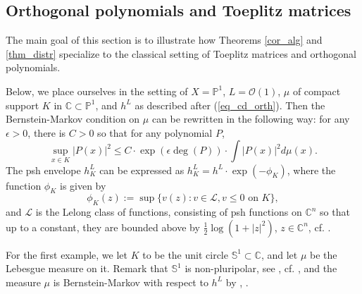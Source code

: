 \documentclass[12pt]{article}
\numberwithin{equation}{section}
\theoremstyle{theorem}
\theoremstyle{definition}
\theoremstyle{remark}
\newcommand{\comp}{\mathbb{C}}
\begin{document}
	\subsection{Orthogonal polynomials and Toeplitz matrices}\label{sect_mat}
	The main goal of this section is to illustrate how Theorems \ref{cor_alg} and \ref{thm_distr} specialize to the classical setting of Toeplitz matrices and orthogonal polynomials.
	\par 
	Below, we place ourselves in the setting of $X = \mathbb{P}^1$, $L = \mathscr{O}(1)$, $\mu$ of compact support $K$ in $\comp \subset \mathbb{P}^1$, and $h^L$ as described after (\ref{eq_cd_orth}).
	Then the Bernstein-Markov condition on $\mu$  can be rewritten in the following way: for any $\epsilon > 0$, there is $C > 0$ so that for any polynomial $P$, 
	\begin{equation}\label{eq_bm_clas0}
		\sup_{x \in K} |P(x)|^2
		\leq
		C
		\cdot
		\exp(\epsilon \deg(P))
		\cdot
		\int |P(x)|^2 d \mu(x).
	\end{equation}
	The psh envelope $h^L_K$ can be expressed as $h^L_K = h^L \cdot \exp(-\phi_K)$, where the function $\phi_K$ is given by
	\begin{equation}
		\phi_K(z) := \sup \{ v(z) : v \in \mathcal{L}, v \leq 0 \text{ on } K \},
	\end{equation}
	and $\mathcal{L}$ is the Lelong class of functions, consisting of psh functions on $\comp^n$ so that up to a constant, they are bounded above by $\frac{1}{2} \log (1 + |z|^2)$, $z \in \comp^n$, cf. \cite[Example 1.2]{GuedZeriGeomAnal}.
	\par 
	For the first example, we let $K$ to be the unit circle $\mathbb{S}^1 \subset \comp$, and let $\mu$ be the Lebesgue measure on it.
	Remark that $\mathbb{S}^1$ is non-pluripolar, see \cite{SadullaevReal}, cf. \cite[Exercise 4.39.5]{GuedjZeriahBook}, and the measure $\mu$ is Bernstein-Markov with respect to $h^L$ by \cite[Corollary 1.8]{BerBoucNys}, \cite[Proposition 3.6]{BernsteinMarkovSurvey}.
	\par 
\end{document}
